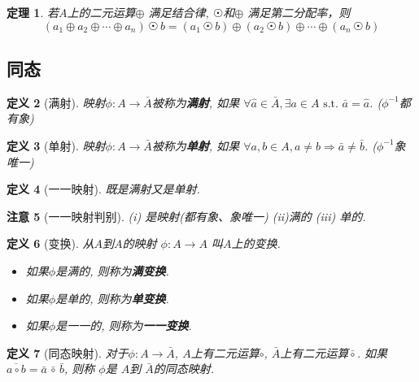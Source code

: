 \documentclass[UTF8]{ctexart}
\newtheorem{Definition}{定义}%
\newtheorem{Theorem}[Definition]{定理}
\newtheorem{Remark}[Definition]{注意}
\begin{document}
\begin{Theorem}
若$A$上的二元运算$\oplus$ 满足结合律, $ \astrosun $和$\oplus $ 满足第二分配率，则
$$
( a_1 \oplus a_2 \oplus \cdots \oplus a_n ) \, \astrosun \, b =  ( a_1 \, \astrosun \, b) \oplus ( a_2 \, \astrosun \, b) \oplus \cdots \oplus (  a_n \, \astrosun \, b)
$$
\end{Theorem}

\subsection{同态}

\begin{Definition}[满射]
映射$\phi: A \rightarrow \bar{A}$被称为\textbf{满射}, 如果
$\forall \hat{a} \in \bar{A}, \exists a \in A \text{ s.t. } \bar{a} = \hat{a}$. 
($\phi^{-1}$都有象)
\end{Definition}

\begin{Definition}[单射]
映射$\phi: A \rightarrow \bar{A}$被称为\textbf{单射}, 如果
$\forall a, b \in A, a \neq b \Rightarrow \bar{a} \neq \bar{b}$.
 ($\phi^{-1}$象唯一)
\end{Definition}

\begin{Definition}[一一映射]
既是满射又是单射.
\end{Definition}

\begin{Remark}[一一映射判别]
(i) 是映射(都有象、象唯一) (ii)满的 (iii) 单的.
\end{Remark}

\begin{Definition}[变换]
从$A$到$A$的映射 $\phi: A \rightarrow A$ 叫$A$上的变换.
\begin{itemize}
	\item 如果$\phi$是满的, 则称为\textbf{满变换}.
	\item 如果$\phi$是单的, 则称为\textbf{单变换}.
	\item 如果$\phi$是一一的, 则称为\textbf{一一变换}.
\end{itemize}
\end{Definition}

\begin{Definition}[同态映射]
对于$\phi: A \rightarrow \bar{A}$, $A$上有二元运算$\circ$, $\bar{A}$上有二元运算$\bar{\circ}$.
如果
$ \overline{a \circ b} = \bar{a} \, \bar{\circ} \, \bar{b}$, 则称 $\phi$是 $A$到 $\bar{A}$的同态映射.
\end{Definition}
\end{document}
